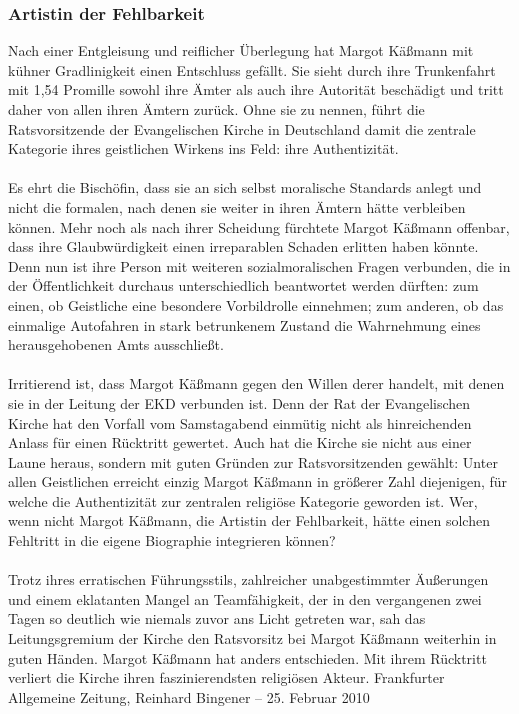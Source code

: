 \documentclass[a4paper,12pt,oneside]{scrbook}
\begin{document}
\subsubsection{Artistin der Fehlbarkeit}
Nach einer Entgleisung und reiflicher Überlegung hat Margot Käßmann mit kühner Gradlinigkeit einen Entschluss gefällt. Sie sieht durch ihre Trunkenfahrt mit 1,54 Promille sowohl ihre Ämter als auch ihre Autorität beschädigt und tritt daher von allen ihren Ämtern zurück. Ohne sie zu nennen, führt die Ratsvorsitzende der Evangelischen Kirche in Deutschland damit die zentrale Kategorie ihres geistlichen Wirkens ins Feld: ihre Authentizität.
\\\\
Es ehrt die Bischöfin, dass sie an sich selbst moralische Standards anlegt und nicht die formalen, nach denen sie weiter in ihren Ämtern hätte verbleiben können. Mehr noch als nach ihrer Scheidung fürchtete Margot Käßmann offenbar, dass ihre Glaubwürdigkeit einen irreparablen Schaden erlitten haben könnte. Denn nun ist ihre Person mit weiteren sozialmoralischen Fragen verbunden, die in der Öffentlichkeit durchaus unterschiedlich beantwortet werden dürften: zum einen, ob Geistliche eine besondere Vorbildrolle einnehmen; zum anderen, ob das einmalige Autofahren in stark betrunkenem Zustand die Wahrnehmung eines herausgehobenen Amts ausschließt.
\\\\
Irritierend ist, dass Margot Käßmann gegen den Willen derer handelt, mit denen sie in der Leitung der EKD verbunden ist. Denn der Rat der Evangelischen Kirche hat den Vorfall vom Samstagabend einmütig nicht als hinreichenden Anlass für einen Rücktritt gewertet. Auch hat die Kirche sie nicht aus einer Laune heraus, sondern mit guten Gründen zur Ratsvorsitzenden gewählt: Unter allen Geistlichen erreicht einzig Margot Käßmann in größerer Zahl diejenigen, für welche die Authentizität zur zentralen religiöse Kategorie geworden ist. Wer, wenn nicht Margot Käßmann, die Artistin der Fehlbarkeit, hätte einen solchen Fehltritt in die eigene Biographie integrieren können?
\\\\
Trotz ihres erratischen Führungsstils, zahlreicher unabgestimmter Äußerungen und einem eklatanten Mangel an Teamfähigkeit, der in den vergangenen zwei Tagen so deutlich wie niemals zuvor ans Licht getreten war, sah das Leitungsgremium der Kirche den Ratsvorsitz bei Margot Käßmann weiterhin in guten Händen. Margot Käßmann hat anders entschieden. Mit ihrem Rücktritt verliert die Kirche ihren faszinierendsten religiösen Akteur.
\newpage
Frankfurter Allgemeine Zeitung, Reinhard Bingener \hfill -- \hfill 25. Februar 2010
\end{document}

